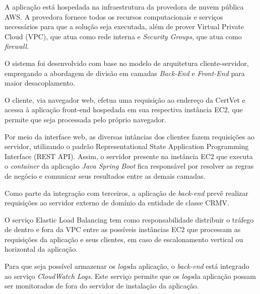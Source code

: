 \documentclass[
    12pt,               %
    openright,          %
    oneside,
    a4paper,            %
    BIBLATEX,           %
    TODO,               %
    english,            %
    brazil              %
    ]{ifsp-spo-inf-ctds}
\begin{document}
        
        


        A aplicação está hospedada na infraestrutura da provedora de nuvem pública AWS. A provedora fornece todos os recursos computacionais e serviços necessários para que a solução seja executada, além de prover Virtual Private Cloud (VPC), que atua como rede interna e \emph{Security Groups}, que atua como \emph{firewall}.
        
        O sistema foi desenvolvido com base no modelo de arquitetura cliente-servidor, empregando a abordagem de divisão em camadas \emph{Back-End} e \emph{Front-End} para maior desacoplamento.
        
        O cliente, via navegador web, efetua uma requisição ao endereço da CertVet e acessa à aplicação front-end hospedada em sua respectiva instância EC2, que permite que seja processada pelo próprio navegador.
        
        Por meio da interface web, as diversas intâncias dos clientes fazem requisições ao servidor, utilizando o padrão Representational State Application Programming Interface (REST API).
        Assim, o servidor presente na instância EC2 que executa o \emph{container} da aplicação \emph{Java Spring Boot} fica responsável por resolver as regras de negócio e comunicar seus resultados entre as demais camadas.
        
        Como parte da integração com terceiros, a aplicação de \emph{back-end} prevê realizar requisições ao servidor externo de domínio da entidade de classe CRMV.
           
        O serviço Elastic Load Balancing tem como responsabilidade distribuir o tráfego de dentro e fora da VPC entre as possíveis instâncias EC2 que processam as requisições da aplicação e seus clientes, em caso de escalonamento vertical ou horizontal da aplicação.
        
        Para que seja possível armazenar os \emph{logs}da aplicação, o \emph{back-end} está integrado ao serviço \emph{CloudWatch Logs}. Este serviço permite que os \emph{logs}da aplicação possam ser monitorados de fora do servidor de instalação da aplicação.
        
\end{document}
